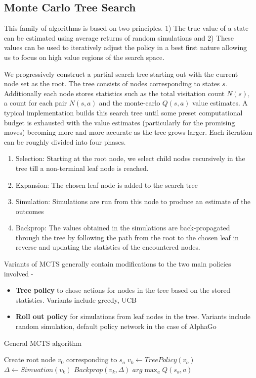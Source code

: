 \documentclass{article}
\begin{document}
\subsection{Monte Carlo Tree Search}
This family of algorithms is based on two principles. 1) The true value of a state can be estimated using average returns of random simulations  and 2) These values can be used to iteratively adjust the policy in a best first nature allowing us to focus on high value regions of the search space. \par
We progressively construct a partial search tree starting out with the current node set as the root. The tree consists of nodes corresponding to states $s$. Additionally each node stores statistics such as the total visitation count $N(s)$, a count for each pair $N(s,a)$ and the monte-carlo $Q(s,a)$ value estimates.
A typical implementation builds this search tree until some preset computational budget is exhausted with the value estimates (particularly for the promising moves) becoming more and more accurate as the tree grows larger. Each iteration can be roughly divided into four phases.
\begin{enumerate}
\item Selection: Starting at the root node, we select child nodes recursively in the tree till a non-terminal leaf node is reached.
\item Expansion: The chosen leaf node is added to the search tree
\item Simulation: Simulations are run from this node to produce an estimate of the outcomes
\item Backprop: The values obtained in the simulations are back-propagated through the tree by following the path from the root to the chosen leaf in reverse and updating the statistics of the encountered nodes.
\end{enumerate}
Variants of MCTS generally contain modifications to the two main policies involved - \begin{itemize}
\item \textbf{Tree policy} to chose actions for nodes in the tree based on the stored statistics. Variants include greedy, UCB
\item \textbf{ Roll out policy }for simulations from leaf nodes in the tree. Variants include random simulation, default policy network in the case of AlphaGo
\end{itemize} 
\begin{algorithm}
\caption{General MCTS algorithm}\label{alg:1}
\begin{algorithmic}[1]
\State Create root node $v_0$ corresponding to $s_o$
\State $v_k \leftarrow TreePolicy(v_o)$
\State $\Delta \leftarrow Simuation(v_k)$
\State $Backprop(v_k,\Delta)$
\EndWhile
\Return $arg\max_a Q(s_o,a)$
\EndFunction
\end{algorithmic}
\end{algorithm}
\end{document}
